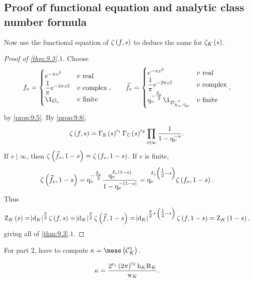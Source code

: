 \subsection{Proof of functional equation and analytic class number formula}

Now use the functional equation of $ \zeta\br{f, s} $ to deduce the same for $ \zeta_K\br{s} $.

\begin{proof}[Proof of \ref{thm:9.3}.$ 1 $]
Choose
$$ f_v =
\begin{cases}
e^{-\pi x^2} & v \ \text{real} \\
\dfrac{1}{\pi}e^{-2\pi z\overline{z}} & v \ \text{complex} \\
\1_{\OOO_v} & v \ \text{finite}
\end{cases},
\qquad \widehat{f_v} =
\begin{cases}
e^{-\pi x^2} & v \ \text{real} \\
\dfrac{1}{\pi}e^{-2\pi z\overline{z}} & v \ \text{complex} \\
\q_v^{-\tfrac{\delta_v}{2}}\1_{\DDD_{K_v / \QQ_p}^{-1}} & v \ \text{finite}
\end{cases},
$$
by \ref{prop:9.5}. By \ref{prop:9.8},
$$ \zeta\br{f, s} = \Gamma_\RR\br{s}^{\r_1}\Gamma_\CC\br{s}^{\r_2}\prod_{v \nmid \infty} \dfrac{1}{1 - \q_v^{-s}}. $$
If $ v \mid \infty $, then $ \zeta\br{\widehat{f_v}, 1 - s} = \zeta\br{f_v, 1 - s} $. If $ v $ is finite,
$$ \zeta\br{\widehat{f_v}, 1 - s} = \q_v^{-\tfrac{\delta_v}{2}}\dfrac{\q_v^{\delta_v\br{1 - s}}}{1 - \q_v^{-\br{1 - s}}} = \q_v^{\delta_v\br{\tfrac{1}{2} - s}}\zeta\br{f_v, 1 - s}. $$
Thus
$$ \Z_K\br{s} = \abs{\d_K}^{\tfrac{s}{2}}\zeta\br{f, s} = \abs{\d_K}^{\tfrac{s}{2}}\zeta\br{\widehat{f}, 1 - s} = \abs{\d_K}^{\tfrac{s}{2} + \br{\tfrac{1}{2} - s}}\zeta\br{f, 1 - s} = \Z_K\br{1 - s}, $$
giving all of \ref{thm:9.3}.$ 1 $.
\end{proof}

\pagebreak

For part $ 2 $, have to compute $ \kappa = \meas\br{\CCC_K^1} $.


\begin{theorem}
\label{thm:9.16}
$$ \kappa = \dfrac{2^{\r_1}\br{2\pi}^{\r_2}\h_K\R_K}{\w_K}. $$
\end{theorem}

